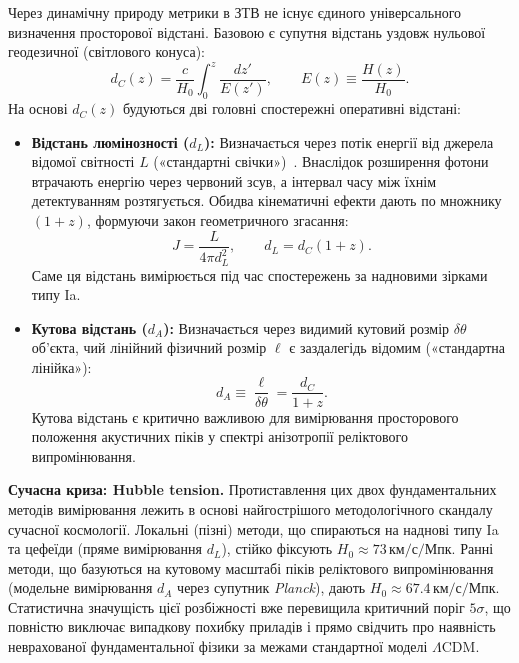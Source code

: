 Через динамічну природу метрики в ЗТВ не існує єдиного універсального визначення просторової відстані. Базовою є супутня відстань уздовж нульової геодезичної (світлового конуса):
\begin{equation}\label{eq:comoving_dist}
  d_C(z) = \frac{c}{H_0}\int_0^z \frac{dz'}{E(z')}, \qquad E(z) \equiv \frac{H(z)}{H_0}.
\end{equation}
На основі $d_C(z)$ будуються дві головні спостережні оперативні відстані:
\begin{itemize}
  \item \textbf{Відстань люмінозності ($d_L$):} Визначається через потік енергії від джерела відомої світності $L$ («стандартні свічки»)~\cite{Perlmutter1999,Riess1998}. Внаслідок розширення фотони втрачають енергію через червоний зсув, а інтервал часу між їхнім детектуванням розтягується. Обидва кінематичні ефекти дають по множнику $(1+z)$, формуючи закон геометричного згасання:
  \begin{equation}\label{eq:d_L}
    J = \frac{L}{4\pi d_L^2}, \qquad d_L = d_C(1+z).
  \end{equation}
  Саме ця відстань вимірюється під час спостережень за надновими зірками типу Ia.
  \item \textbf{Кутова відстань ($d_A$):} Визначається через видимий кутовий розмір $\delta\theta$ об'єкта, чий лінійний фізичний розмір $\ell$ є заздалегідь відомим («стандартна лінійка»):
  \begin{equation}\label{eq:d_A}
    d_A \equiv \frac{\ell}{\delta\theta} = \frac{d_C}{1+z}.
  \end{equation}
  Кутова відстань є критично важливою для вимірювання просторового положення акустичних піків у спектрі анізотропії реліктового випромінювання.
\end{itemize}

\begin{keybox}
\textbf{Сучасна криза: Hubble tension.}
Протиставлення цих двох фундаментальних методів вимірювання лежить в основі найгострішого методологічного скандалу сучасної космології.
Локальні (пізні) методи, що спираються на наднові типу Ia та цефеїди (пряме вимірювання $d_L$), стійко фіксують $H_0 \approx 73\,\text{км/с/Мпк}$.
Ранні методи, що базуються на кутовому масштабі піків реліктового випромінювання (модельне вимірювання $d_A$ через супутник \textit{Planck}), дають $H_0 \approx 67.4\,\text{км/с/Мпк}$.
Статистична значущість цієї розбіжності вже перевищила критичний поріг $5\sigma$, що повністю виключає випадкову похибку приладів і прямо свідчить про наявність неврахованої фундаментальної фізики за межами стандартної моделі $\Lambda$CDM.
\end{keybox}

